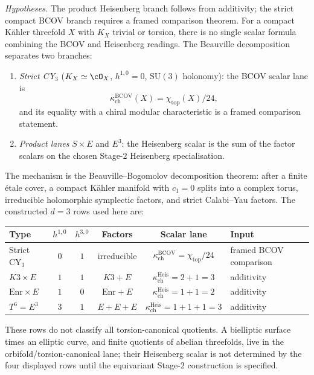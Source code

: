 \begin{proposition}[Beauville branch split for constructed scalar lanes at
\texorpdfstring{$d = 3$}{d = 3}]
\label{prop:beauville-kappa-formula}
\noindent\emph{Hypotheses.} The product Heisenberg branch follows from additivity; the strict compact BCOV branch requires a framed comparison theorem.
For a compact K\"ahler threefold \(X\) with \(K_X\) trivial or torsion,
there is no single scalar formula
combining the BCOV and Heisenberg readings. The Beauville decomposition
separates two branches:
\begin{enumerate}[label=\textup{(\roman*)}]
 \item \emph{Strict CY$_3$} (\(K_X\simeq\cO_X\), \(h^{1,0}=0\),
 \(\mathrm{SU}(3)\) holonomy): the BCOV scalar lane is
 \[
   \kappa_{\mathrm{ch}}^{\mathrm{BCOV}}(X)=\chi_{\mathrm{top}}(X)/24,
 \]
 and its equality with a chiral modular characteristic is a framed
 comparison statement.
 \item \emph{Product lanes} \(S\times E\) and \(E^3\): the Heisenberg scalar is the sum of the factor scalars on the chosen Stage-$2$ Heisenberg specialisation.
\end{enumerate}

The mechanism is the Beauville--Bogomolov decomposition theorem: after a finite \'etale cover, a compact K\"ahler manifold with \(c_1=0\) splits into a complex torus, irreducible holomorphic symplectic factors, and strict Calabi--Yau factors. The constructed \(d=3\) rows used here are:
\begin{center}
\renewcommand{\arraystretch}{1.2}
\begin{tabular}{lccccl}
 \toprule
 \textbf{Type} & $h^{1,0}$ & $h^{3,0}$ & \textbf{Factors} & \textbf{Scalar lane} & \textbf{Input} \\
 \midrule
 Strict CY$_3$ & $0$ & $1$ & irreducible & $\kappa_{\mathrm{ch}}^{\mathrm{BCOV}}=\chi_{\mathrm{top}}/24$ & framed BCOV comparison \\
 $K3 \times E$ & $1$ & $1$ & $K3 + E$ & $\kappa_{\mathrm{ch}}^{\mathrm{Heis}}=2 + 1 = 3$ & additivity \\
 $\mathrm{Enr} \times E$ & $1$ & $0$ & $\mathrm{Enr} + E$ & $\kappa_{\mathrm{ch}}^{\mathrm{Heis}}=1 + 1 = 2$ & additivity \\
 $T^6 = E^3$ & $3$ & $1$ & $E + E + E$ & $\kappa_{\mathrm{ch}}^{\mathrm{Heis}}=1 + 1 + 1 = 3$ & additivity \\
 \bottomrule
\end{tabular}
\end{center}
These rows do not classify all torsion-canonical quotients. A bielliptic surface times an elliptic curve, and finite quotients of abelian threefolds, live in the orbifold/torsion-canonical lane; their Heisenberg scalar is not determined by the four displayed rows until the equivariant Stage-$2$ construction is specified.


\end{proposition}
